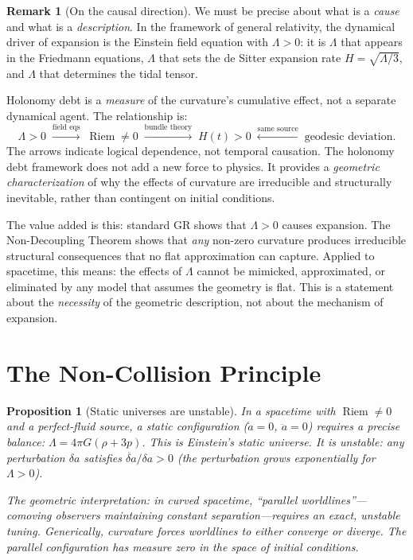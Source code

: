 \documentclass[12pt]{amsart}
\newtheorem{proposition}[theorem]{Proposition}
\theoremstyle{definition}
\newtheorem{remark}[theorem]{Remark}
\newcommand{\Riem}{\operatorname{Riem}}
\begin{document}
\begin{remark}[On the causal direction]
\label{rmk:causal}
We must be precise about what is a \emph{cause} and what is a \emph{description}.  In the framework of general relativity, the dynamical driver of expansion is the Einstein field equation with $\Lambda > 0$: it is $\Lambda$ that appears in the Friedmann equations, $\Lambda$ that sets the de Sitter expansion rate $H = \sqrt{\Lambda/3}$, and $\Lambda$ that determines the tidal tensor.

Holonomy debt is a \emph{measure} of the curvature's cumulative effect, not a separate dynamical agent.  The relationship is:
\[
\Lambda > 0 \;\xrightarrow{\text{field eqs}}\; \Riem \neq 0 \;\xrightarrow{\text{bundle theory}}\; H(t) > 0 \;\xleftarrow{\text{same source}}\; \text{geodesic deviation}.
\]
The arrows indicate logical dependence, not temporal causation.  The holonomy debt framework does not add a new force to physics.  It provides a \emph{geometric characterization} of why the effects of curvature are irreducible and structurally inevitable, rather than contingent on initial conditions.

The value added is this: standard GR shows that $\Lambda > 0$ causes expansion.  The Non-Decoupling Theorem shows that \emph{any} non-zero curvature produces irreducible structural consequences that no flat approximation can capture.  Applied to spacetime, this means: the effects of $\Lambda$ cannot be mimicked, approximated, or eliminated by any model that assumes the geometry is flat.  This is a statement about the \emph{necessity} of the geometric description, not about the mechanism of expansion.
\end{remark}


\section{The Non-Collision Principle}

\begin{proposition}[Static universes are unstable]
\label{prop:static}
In a spacetime with $\Riem \neq 0$ and a perfect-fluid source, a static configuration ($\dot a = 0$, $\ddot a = 0$) requires a precise balance: $\Lambda = 4\pi G(\rho + 3p)$.  This is Einstein's static universe.  It is unstable: any perturbation $\delta a$ satisfies $\ddot{\delta a}/\delta a > 0$ (the perturbation grows exponentially for $\Lambda > 0$).

The geometric interpretation: in curved spacetime, ``parallel worldlines''---comoving observers maintaining constant separation---requires an exact, unstable tuning.  Generically, curvature forces worldlines to either converge or diverge.  The parallel configuration has measure zero in the space of initial conditions.
\end{proposition}
\end{document}
